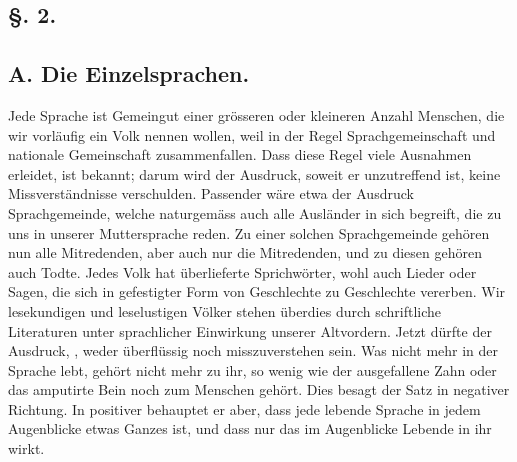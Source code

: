 \subsection*{§. 2.}\label{I.II.2}
\subsection*{A. Die Einzelsprachen.}

Jede Sprache ist Gemeingut einer grösseren oder kleineren Anzahl Menschen, die wir vorläufig ein Volk nennen wollen, weil in der Regel Sprachgemeinschaft und nationale Gemeinschaft zusammenfallen. Dass diese Regel viele Ausnahmen erleidet, ist bekannt; darum wird der Ausdruck, soweit er unzutreffend ist, keine Missverständnisse verschulden. Passender wäre etwa der Ausdruck Sprachgemeinde, welche naturgemäss auch alle Ausländer in sich begreift, die zu uns in unserer Muttersprache reden. Zu einer solchen Sprachgemeinde gehören nun alle Mitredenden, aber auch nur die Mitredenden, und zu diesen gehören auch Todte. Jedes Volk hat überlieferte Sprichwörter, wohl auch Lieder oder Sagen, die sich in gefestigter Form von Geschlechte zu Geschlechte vererben. Wir lesekundigen und leselustigen Völker stehen überdies durch schriftliche Literaturen unter  sprachlicher Einwirkung unserer Altvordern. Jetzt dürfte der Ausdruck, , weder überflüssig noch misszuverstehen sein. Was nicht mehr in der Sprache lebt, gehört nicht mehr zu ihr, so wenig wie der ausgefallene Zahn oder das amputirte Bein noch zum Menschen gehört. Dies besagt der Satz in negativer Richtung. In positiver behauptet er aber, dass jede lebende Sprache in jedem Augenblicke etwas Ganzes ist, und dass nur das im Augenblicke Lebende in ihr wirkt.

